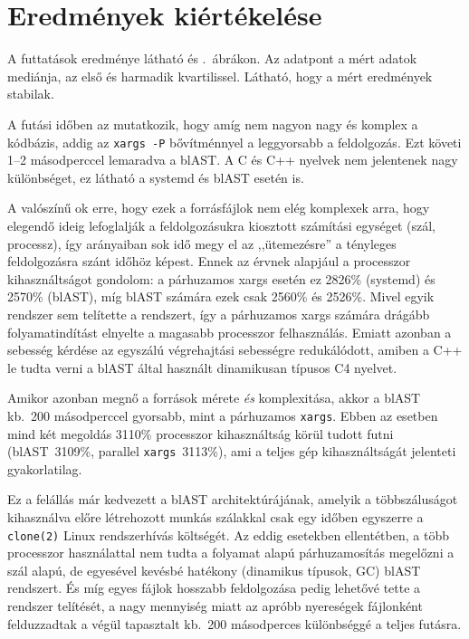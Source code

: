 \section{Eredmények kiértékelése}

A futtatások eredménye látható  és .~ábrákon.
Az adatpont a mért adatok mediánja, az első és harmadik kvartilissel.
Látható, hogy a mért eredmények stabilak.

A futási időben az mutatkozik, hogy amíg nem nagyon nagy és komplex a kódbázis, addig az {\tt xargs -P} bővítménnyel a leggyorsabb a feldolgozás.
Ezt követi 1--2 másodperccel lemaradva a blAST.
A C és C++ nyelvek nem jelentenek nagy különbséget, ez látható a systemd és blAST esetén is.

A valószínű ok erre, hogy ezek a forrásfájlok nem elég komplexek arra, hogy elegendő ideig lefoglalják a feldolgozásukra kiosztott számítási egységet (szál, processz), így arányaiban sok idő megy el az ,,ütemezésre'' a tényleges feldolgozásra szánt időhöz képest.
Ennek az érvnek alapjául a processzor kihasználtságot gondolom: a párhuzamos xargs esetén ez 2826\% (systemd) és 2570\% (blAST), míg blAST számára ezek csak 2560\% és 2526\%.
Mivel egyik rendszer sem telítette a rendszert, így a párhuzamos xargs számára drágább folyamatindítást elnyelte a magasabb processzor felhasználás.
Emiatt azonban a sebesség kérdése az egyszálú végrehajtási sebességre redukálódott, amiben a C++ le tudta verni a blAST által használt dinamikusan típusos C4 nyelvet.

Amikor azonban megnő a források mérete {\it és} komplexitása, akkor a blAST kb.~200 másodperccel gyorsabb, mint a párhuzamos {\tt xargs}.
Ebben az esetben mind két megoldás 3110\% processzor kihasználtság körül tudott futni (blAST~3109\%, parallel {\tt xargs}~3113\%), ami a teljes gép kihasználtságát jelenteti gyakorlatilag.

Ez a felállás már kedvezett a blAST architektúrájának, amelyik a többszáluságot kihasználva előre létrehozott munkás szálakkal csak egy időben egyszerre a {\tt clone(2)} Linux rendszerhívás költségét.
Az eddig esetekben ellentétben, a több processzor használattal nem tudta a folyamat alapú párhuzamosítás megelőzni a szál alapú, de egyesével kevésbé hatékony (dinamikus típusok, \gls{GC}) blAST rendszert.
És míg egyes fájlok hosszabb feldolgozása pedig lehetővé tette a rendszer telítését, a nagy mennyiség miatt az apróbb nyereségek fájlonként felduzzadtak a végül tapasztalt kb.~200 másodperces különbséggé a teljes futásra.


